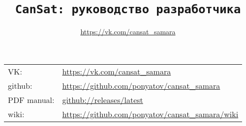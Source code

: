 

\title{\LARGE{\texttt{CanSat: руководство разработчика}}}
\author{\url{https://vk.com/cansat_samara}}



\maketitle

\tableofcontents
\secdown

\clearpage
{}

\noindent
\begin{tabular}{l l}
VK: &\url{https://vk.com/cansat_samara}\\
github: &\url{https://github.com/ponyatov/cansat_samara}\\
PDF manual: &\href{https://github.com/ponyatov/cansat_samara/releases/latest}{github://releases/latest} \\
wiki: &\url{https://github.com/ponyatov/cansat_samara/wiki}\\
\end{tabular}







